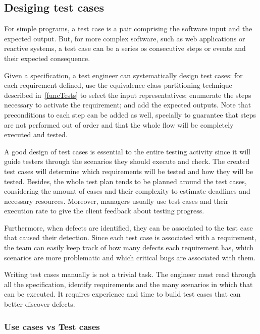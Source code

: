\subsection{Desiging test cases}
\label{sec:testcasesdesign}


For simple programs, a test case is a pair comprising the software input and the expected output. But, for more complex software, such as web applications or reactive systems, a test case can be a series os consecutive steps or events and their expected consequence.

Given a specification, a test engineer can systematically design test cases: for each requirement defined, use the equivalence class partitioning technique described in~\ref{funcTests} to select the input representatives; enumerate the steps necessary to activate the requirement; and add the expected outputs. Note that preconditions to each step can be added as well, specially to guarantee that steps are not performed out of order and that the whole flow will be completely executed and tested.

A good design of test cases is essential to the entire testing activity since it will guide testers through the scenarios they should execute and check. The created test cases will determine which requirements will be tested and how they will be tested. Besides, the whole test plan tends to be planned around the test cases, considering the amount of cases and their complexity to estimate deadlines and necessary resources. Moreover, managers usually use test cases and their execution rate to give the client feedback about testing progress.

Furthermore, when defects are identified, they can be associated to the test case that caused their detection. Since each test case is associated with a requirement, the team can easily keep track of how many defects each requirement has, which scenarios are more problematic and which critical bugs are associated with them.

Writing test cases manually is not a trivial task. The engineer must read through all the specification, identify requirements and the many scenarios in which that can be executed. It requires experience and time to build test cases that can better discover defects. 


\subsubsection{Use cases vs Test cases}

